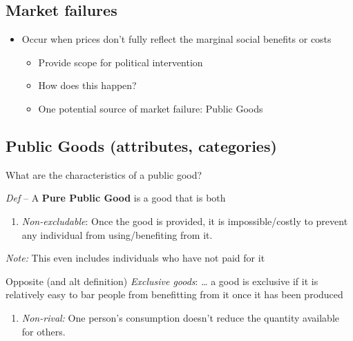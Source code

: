 \documentclass[]{article}
\providecommand{\tightlist}{%
  \setlength{\itemsep}{0pt}\setlength{\parskip}{0pt}}
\begin{document}
\hypertarget{market-failures}{%
\subsection{Market failures}\label{market-failures}}

\begin{itemize}
\tightlist
\item
  Occur when prices don't fully reflect the marginal social benefits or costs

  \begin{itemize}
  \tightlist
  \item
    Provide scope for political intervention
  \item
    How does this happen?
  \item
    One potential source of market failure: Public Goods
  \end{itemize}
\end{itemize}

\hypertarget{public-goods-attributes-categories}{%
\subsection{Public Goods (attributes, categories)}\label{public-goods-attributes-categories}}

What are the characteristics of a public good?

\emph{Def} -- A \textbf{Pure Public Good} is a good that is both

\bigskip

\begin{enumerate}
\def\labelenumi{\arabic{enumi}.}
\tightlist
\item
  \emph{Non-excludable}: Once the good is provided, it is impossible/costly to prevent any individual from using/benefiting from it.
\end{enumerate}

\emph{Note:} This even includes individuals who have not paid for it

\bigskip

Opposite (and alt definition)
\emph{Exclusive goods}: \ldots{} a good is exclusive if it is relatively easy to bar people from benefitting from it once it has been produced

\bigskip

\begin{enumerate}
\def\labelenumi{\arabic{enumi}.}
\setcounter{enumi}{1}
\tightlist
\item
  \emph{Non-rival:} One person's consumption doesn't reduce the quantity available for others.
\end{enumerate}
\end{document}
